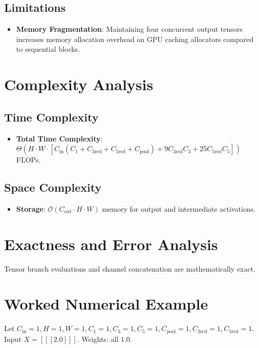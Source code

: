 \documentclass[11pt,a4paper]{article}
\theoremstyle{definition}
\begin{document}
\subsection{Limitations}
\begin{itemize}
    \item \textbf{Memory Fragmentation}: Maintaining four concurrent output tensors increases memory allocation overhead on GPU caching allocators compared to sequential blocks.
\end{itemize}

\section{Complexity Analysis}

\subsection{Time Complexity}
\begin{itemize}
    \item \textbf{Total Time Complexity}: $\Theta(H \cdot W \cdot [C_{\text{in}}(C_1 + C_{3\text{red}} + C_{5\text{red}} + C_{\text{pool}}) + 9 C_{3\text{red}} C_3 + 25 C_{5\text{red}} C_5])$ FLOPs.
\end{itemize}

\subsection{Space Complexity}
\begin{itemize}
    \item \textbf{Storage}: $\mathcal{O}(C_{\text{out}} \cdot H \cdot W)$ memory for output and intermediate activations.
\end{itemize}

\section{Exactness and Error Analysis}

Tensor branch evaluations and channel concatenation are mathematically exact.

\section{Worked Numerical Example}

Let $C_{\text{in}} = 1, H = 1, W = 1, C_1 = 1, C_3 = 1, C_5 = 1, C_{\text{pool}} = 1, C_{3\text{red}} = 1, C_{5\text{red}} = 1$.
Input $X = [[[2.0]]]$. Weights: all $1.0$.
\end{document}
